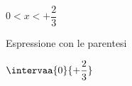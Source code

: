 \begin{esempio}
\begin{itemize}
\begin{enumerate}
\begin{minipage}{.32\textwidth}
 \begin{center}
  \(0 < x < +\dfrac{2}{3}\)
  \vspace{1em}
 \end{center}
  \end{minipage}
  \begin{minipage}{.32\textwidth}
  Espressione con le parentesi\\[-.3em]
  
 \begin{center}
  \(\intervaa{0}{+\dfrac{2}{3}}\)
  \vspace{.8em}
 \end{center}
  \end{minipage}
\end{enumerate}

\end{itemize}
\end{esempio}

